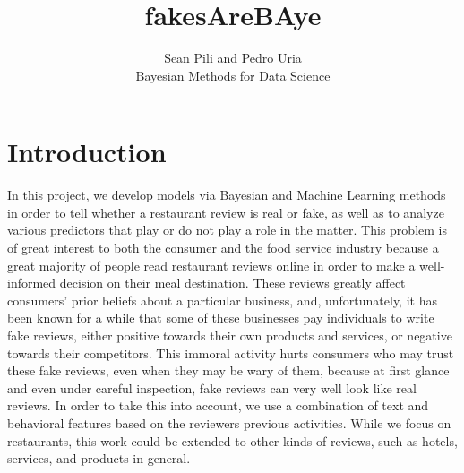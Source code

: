 
\usepackage{lipsum}
\usepackage{amsmath}
\usepackage{harmony} %
\usepackage{dirtytalk} %


\usepackage{hyperref}
\usepackage[american]{babel}
\usepackage{ulem}
\usepackage{graphicx}
\usepackage{csquotes}
\usepackage[style=apa,sortcites=true,sorting=nyt,backend=biber]{biblatex}

\title{fakesAreBAye}


\author{Sean Pili and Pedro Uria \\ Bayesian Methods for Data Science}



\maketitle

\section{Introduction}

In this project, we develop models via Bayesian and Machine Learning methods in order to tell whether a restaurant review is real or fake, as well as to analyze various predictors that play or do not play a role in the matter. This problem is of great interest to both the consumer and the food service industry because a great majority of people read restaurant reviews online in order to make a well-informed decision on their meal destination. These reviews greatly affect consumers' prior beliefs about a particular business, and, unfortunately, it has been known for a while that some of these businesses pay individuals to write fake reviews, either positive towards their own products and services, or negative towards their competitors. This immoral activity hurts consumers who may trust these fake reviews, even when they may be wary of them, because at first glance and even under careful inspection, fake reviews can very well look like real reviews. In order to take this into account, we use a combination of text and behavioral features based on the reviewers previous activities. While we focus on restaurants, this work could be extended to other kinds of reviews, such as hotels, services, and products in general.

